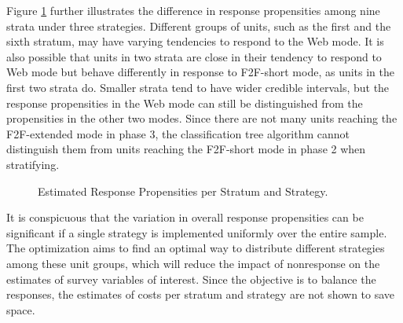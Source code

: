 \documentclass[12pt]{article}
\makeatletter
\def\fixFloatSize#1{}%
\makeatother
\begin{document}
Figure \ref{fig-strata-response-propensities} further illustrates the difference in response propensities among nine strata under three strategies.
Different groups of units, such as the first and the sixth stratum, may have varying tendencies to respond to the Web mode.
It is also possible that units in two strata are close in their tendency to respond to Web mode but behave differently in response to F2F-short mode, as units in the first two strata do.
Smaller strata tend to have wider credible intervals, but the response propensities in the Web mode can still be distinguished from the propensities in the other two modes.
Since there are not many units reaching the F2F-extended mode in phase 3, the classification tree algorithm cannot distinguish them from units reaching the F2F-short mode in phase 2 when stratifying.
\bgroup
\fixFloatSize{images/propensitiesByStratum.png}
\begin{figure}[!htbp]
\centering \makeatletter{}
\makeatother 
\caption{{Estimated Response Propensities per Stratum and Strategy.}}
\label{fig-strata-response-propensities}
\end{figure}
\egroup

It is conspicuous that the variation in overall response propensities can be significant if a single strategy is implemented uniformly over the entire sample.
The optimization aims to find an optimal way to distribute different strategies among these unit groups, which will reduce the impact of nonresponse on the estimates of survey variables of interest.
Since the objective is to balance the responses, the estimates of costs per stratum and strategy are not shown to save space.
\end{document}
